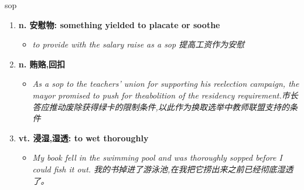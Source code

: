 
\begin{frame}
{\huge sop}
\begin{center}
\begin{enumerate}\Large
  \item \textbf{n. 安慰物: something yielded to placate or soothe}
  \begin{itemize}
    \item \em{\Large{to provide with the salary raise as a sop 提高工资作为安慰}}
  \end{itemize}
  \item \textbf{n. 贿赂,回扣}
  \begin{itemize}
    \item \em{\Large{As a sop to the teachers' union for supporting his reelection campaign, the mayor promised to push for theabolition of the residency requirement.市长答应推动废除获得绿卡的限制条件,以此作为换取选举中教师联盟支持的条件}}
  \end{itemize}
  \item \textbf{vt. 浸湿,湿透: to wet thoroughly}
  \begin{itemize}
    \item \em{\Large{My book fell in the swimming pool and was thoroughly sopped before I could fish it out. 我的书掉进了游泳池,在我把它捞出来之前已经彻底湿透了。}}
  \end{itemize}
\end{enumerate}
\end{center}
\end{frame}
